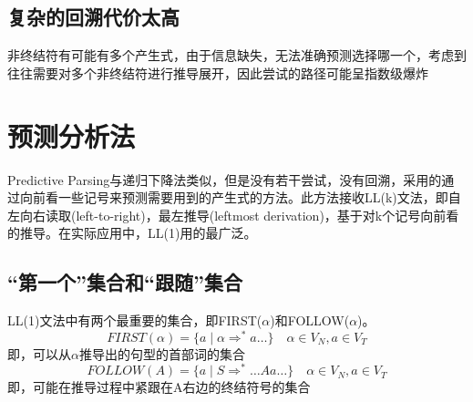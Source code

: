 \documentclass[]{report}
\begin{document}
		\subsection{复杂的回溯代价太高}
		非终结符有可能有多个产生式，由于信息缺失，无法准确预测选择哪一个，考虑到往往需要对多个非终结符进行推导展开，因此尝试的路径可能呈指数级爆炸
	\section{预测分析法}
		Predictive Parsing与递归下降法类似，但是没有若干尝试，没有回溯，采用的通过向前看一些记号来预测需要用到的产生式的方法。此方法接收LL(k)文法，即自左向右读取(left-to-right)，最左推导(leftmost derivation)，基于对k个记号向前看的推导。在实际应用中，LL(1)用的最广泛。
		\subsection{“第一个”集合和“跟随”集合}
		LL(1)文法中有两个最重要的集合，即FIRST($\alpha$)和FOLLOW($\alpha$)。
		\[FIRST(\alpha)=\{a\mid\alpha\Rightarrow^*a\dots\}\quad\alpha\in V_N,a\in V_T\]
		即，可以从$\alpha$推导出的句型的首部词的集合
		\[FOLLOW(A)=\{a\mid S\Rightarrow^*\dots Aa\dots\}\quad\alpha\in V_N,a\in V_T\]
		即，可能在推导过程中紧跟在A右边的终结符号的集合
\end{document}
